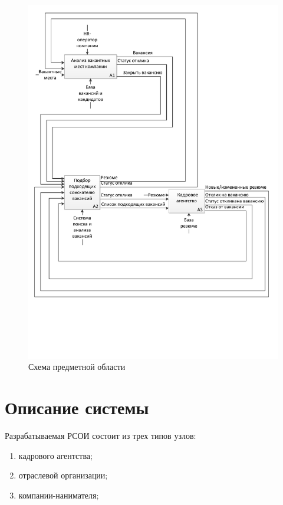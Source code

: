 \begin{figure}[ht]
\centering
\includegraphics[width=\textwidth]{include/idef0.pdf}
\caption{Схема предметной области}
\label{fig:idef0}
\end{figure}

\section{Описание системы}
Разрабатываемая РСОИ состоит из трех типов узлов:
\begin{enumerate}
\item кадрового агентства;
\item отраслевой организации;
\item компании-нанимателя;
\end{enumerate} 

